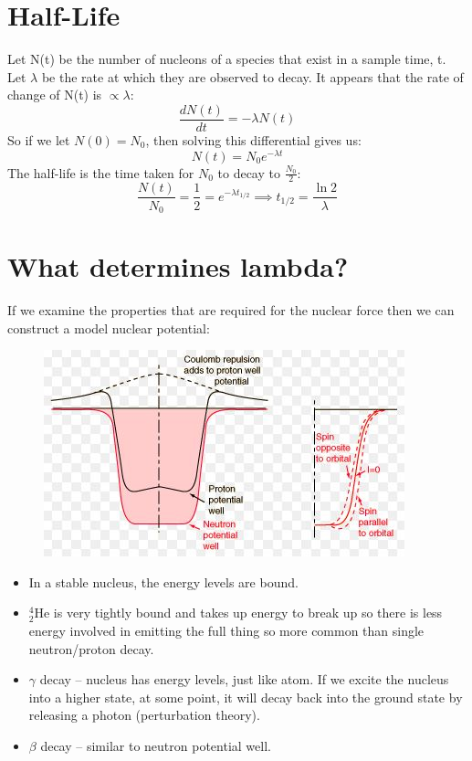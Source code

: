 \documentclass[a4paper, 11pt, normalem]{report}
\begin{document}
\section{Half-Life}
Let N(t) be the number of nucleons of a species that exist in a sample time, t.
Let $\lambda$ be the rate at which they are observed to decay.
It appears that the rate of change of N(t) is $\propto \lambda$:
\begin{equation}
    \frac{dN(t)}{dt} = -\lambda N(t)
\end{equation}
So if we let $N(0) = N_{0}$, then solving this differential gives us:
\begin{equation}
    N(t) = N_{0}e^{-\lambda t}
\end{equation}
The half-life is the time taken for $N_{0}$ to decay to $\frac{N_{0}}{2}$:
\begin{equation}
    \frac{N(t)}{N_{0}} = \frac{1}{2} = e^{-\lambda t_{1/2}} \implies t_{1/2} = \frac{\ln{2}}{\lambda}
\end{equation}

\section{What determines lambda?}
If we examine the properties that are required for the nuclear force then we can construct a model nuclear potential:
\begin{figure}[H]
    \centering
    \includegraphics{lamb.jpg}
\end{figure}
\begin{itemize}
    \item In a stable nucleus, the energy levels are bound.
    \item $_{2}^{4}$He is very tightly bound and takes up energy to break up so there is less energy involved in emitting the full thing so more common than single neutron/proton decay.
    \item $\gamma$ decay -- nucleus has energy levels, just like atom.
        If we excite the nucleus into a higher state, at some point, it will decay back into the ground state by releasing a photon (perturbation theory).
    \item $\beta$ decay -- similar to neutron potential well.
\end{itemize}
\end{document}
